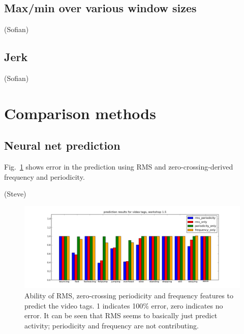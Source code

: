 \documentclass{article}
\begin{document}
\subsection{Max/min over various window sizes}

(Sofian)

\subsection{Jerk}

(Sofian)

\section{Comparison methods}

\subsection{Neural net prediction}

Fig.~\ref{fig:predresults} shows error in the prediction using RMS and
zero-crossing-derived frequency and periodicity.

(Steve)

\begin{figure}
\centerline{\includegraphics[width=\textwidth]{images/predictionresults.png}}
\caption{Ability of RMS, zero-crossing periodicity and frequency
  features to predict the video tags.  1 indicates 100\% error, zero
  indicates no error.  It can be seen that RMS seems to basically just
  predict activity; periodicity and frequency are not contributing.}
\label{fig:predresults}
\end{figure}
\end{document}
